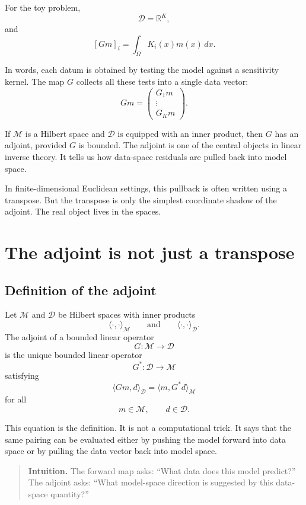 \documentclass[11pt,a4paper]{book}
\newenvironment{intuition}
  {\begin{quote}\textbf{Intuition.}}
  {\end{quote}}
\newcommand{\M}{\mathcal{M}}      %
\newcommand{\D}{\mathcal{D}}      %
\newcommand{\R}{\mathbb{R}}
\newcommand{\G}{G}
\newcommand{\Gadj}{G^\ast}
\begin{document}
For the toy problem,
\[
    \D=\R^K,
\]
and
\[
    [\G m]_i
    =
    \int_\Omega K_i(x)m(x)\,dx.
\]

In words, each datum is obtained by testing the model against a sensitivity
kernel. The map $\G$ collects all these tests into a single data vector:
\[
    \G m
    =
    \begin{pmatrix}
        \G_1 m\\
        \vdots\\
        \G_K m
    \end{pmatrix}.
\]

If $\M$ is a Hilbert space and $\D$ is equipped with an inner product, then
$\G$ has an adjoint, provided $\G$ is bounded. The adjoint is one of the central
objects in linear inverse theory. It tells us how data-space residuals are
pulled back into model space.

In finite-dimensional Euclidean settings, this pullback is often written using
a transpose. But the transpose is only the simplest coordinate shadow of the
adjoint. The real object lives in the spaces.

\section{The adjoint is not just a transpose}

\subsection{Definition of the adjoint}

Let $\M$ and $\D$ be Hilbert spaces with inner products
\[
    \langle\cdot,\cdot\rangle_{\M}
    \qquad
    \text{and}
    \qquad
    \langle\cdot,\cdot\rangle_{\D}.
\]
The adjoint of a bounded linear operator
\[
    \G:\M\to\D
\]
is the unique bounded linear operator
\[
    \Gadj:\D\to\M
\]
satisfying
\[
    \langle \G m, d\rangle_{\D}
    =
    \langle m, \Gadj d\rangle_{\M}
\]
for all
\[
    m\in\M,
    \qquad
    d\in\D.
\]

This equation is the definition. It is not a computational trick. It says that
the same pairing can be evaluated either by pushing the model forward into data
space or by pulling the data vector back into model space.

\begin{intuition}
The forward map asks: ``What data does this model predict?''
The adjoint asks: ``What model-space direction is suggested by this data-space
quantity?''
\end{intuition}
\end{document}
